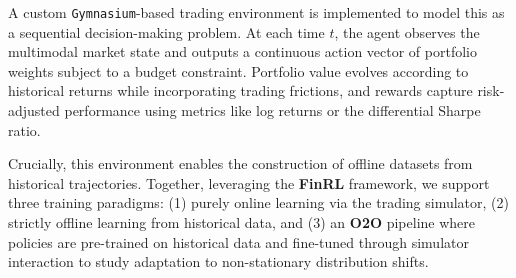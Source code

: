 \documentclass[10pt]{article}
\begin{document}

A custom \texttt{Gymnasium}-based trading environment is implemented to model this as a sequential decision-making problem. At each time $t$, the agent observes the multimodal market state and outputs a continuous action vector of portfolio weights subject to a budget constraint. Portfolio value evolves according to historical returns while incorporating trading frictions, and rewards capture risk-adjusted performance using metrics like log returns or the differential Sharpe ratio. 

Crucially, this environment enables the construction of offline datasets from historical trajectories. Together, leveraging the \textbf{FinRL} framework, we support three training paradigms: (1) purely online learning via the trading simulator, (2) strictly offline learning from historical data, and (3) an \textbf{O2O} pipeline where policies are pre-trained on historical data and fine-tuned through simulator interaction to study adaptation to non-stationary distribution shifts.





\end{document}

